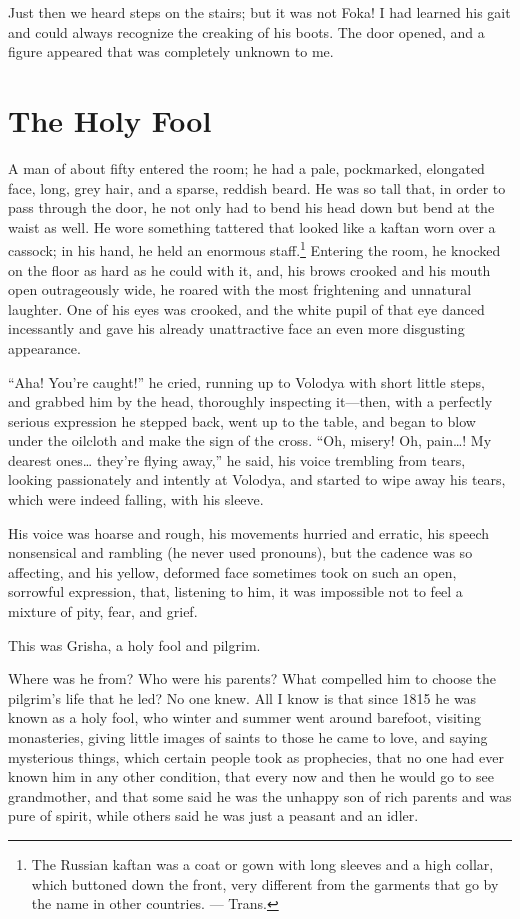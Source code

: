 Just then we heard steps on the stairs; but it was not Foka! I had learned his gait and could always recognize the creaking of his boots. The door opened, and a figure appeared that was completely unknown to me.

\chapter{The Holy Fool} %

A man of about fifty entered the room; he had a pale, pockmarked, elongated face, long, grey hair, and a sparse, reddish beard. He was so tall that, in order to pass through the door, he not only had to bend his head down but bend at the waist as well. He wore something tattered that looked like a kaftan worn over a cassock; in his hand, he held an enormous staff.\footnote{The Russian kaftan was a coat or gown with long sleeves and a high collar, which buttoned down the front, very different from the garments that go by the name in other countries. --- Trans.} Entering the room, he knocked on the floor as hard as he could with it, and, his brows crooked and his mouth open outrageously wide, he roared with the most frightening and unnatural laughter. One of his eyes was crooked, and the white pupil of that eye danced incessantly and gave his already unattractive face an even more disgusting  appearance.

``Aha! You're caught!'' he cried, running up to Volodya with short little steps, and grabbed him by the head, thoroughly inspecting it---then, with a perfectly serious expression he stepped back, went up to the table, and began to blow under the oilcloth and make the sign of the cross. ``Oh, misery! Oh, pain\ldots{}! My dearest ones\ldots{} they're flying away,'' he said, his voice trembling from tears, looking passionately and intently at Volodya, and started to wipe away his tears, which were indeed falling, with his sleeve. %

His voice was hoarse and rough, his movements hurried and erratic, his speech nonsensical and rambling (he never used pronouns), but the cadence was so affecting, and his yellow, deformed face sometimes took on such an open, sorrowful expression, that, listening to him, it was impossible not to feel a mixture of pity, fear, and grief.

This was Grisha, a holy fool and pilgrim.

Where was he from? Who were his parents? What compelled him to choose the pilgrim's life that he led? No one knew. All I know is that since 1815  he was known as a holy fool, who winter and summer went around barefoot, visiting monasteries, giving little images of saints  to those he came to love, and saying mysterious things, which certain people took as prophecies, that no one had ever known him in any other condition, that every now and then he would go to see grandmother, and that some said he was the unhappy son of rich parents and was pure of spirit, while others said he was just a peasant and an idler.

